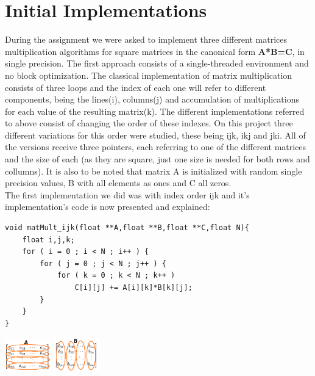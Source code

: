 \documentclass[journal]{IEEEtran}
\begin{document}
\section{Initial Implementations}
During the assignment we were asked to implement three different matrices multiplication algorithms for  square matrices in the canonical form \textbf{A*B=C}, in single precision. The first approach consists of a single-threaded environment and no block optimization. The classical implementation of matrix multiplication consists of three loops and the index of each one will refer to different components, being the lines(i), columns(j) and accumulation of multiplications for each value of the resulting matrix(k). The different implementations referred to above consist of changing the order of these indexes. On this project three different variations for this order were studied, these being ijk, ikj and jki. All of the versions receive three pointers, each referring to one of the different matrices and the size of each (as they are square, just one size is needed for both rows and collumns). It is also to be noted that matrix A is initialized with random single precision values, B with all elements as ones and C all zeros.\\
The first implementation we did was with index order ijk and it's implementation's code is now presented and explained:
\begin{lstlisting}
void matMult_ijk(float **A,float **B,float **C,float N){
    float i,j,k;
    for ( i = 0 ; i < N ; i++ ) {
        for ( j = 0 ; j < N ; j++ ) {
            for ( k = 0 ; k < N ; k++ )
                C[i][j] += A[i][k]*B[k][j];
        }
    }
}
\end{lstlisting}

\includegraphics[width=0.15\textwidth, left]{A_row.png}
\includegraphics[width=0.15\textwidth, right]{B_column.png}
\end{document}

